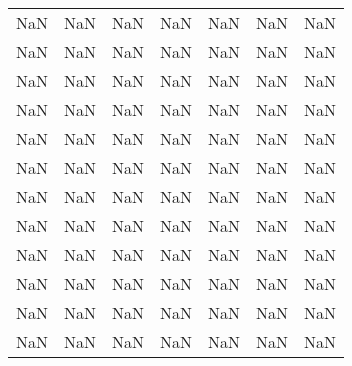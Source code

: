 \begin{tabular}{rrrrrrr}
     NaN &         NaN &         NaN &     NaN &   NaN &          NaN &      NaN \\
     NaN &         NaN &         NaN &     NaN &   NaN &          NaN &      NaN \\
     NaN &         NaN &         NaN &     NaN &   NaN &          NaN &      NaN \\
     NaN &         NaN &         NaN &     NaN &   NaN &          NaN &      NaN \\
     NaN &         NaN &         NaN &     NaN &   NaN &          NaN &      NaN \\
     NaN &         NaN &         NaN &     NaN &   NaN &          NaN &      NaN \\
     NaN &         NaN &         NaN &     NaN &   NaN &          NaN &      NaN \\
     NaN &         NaN &         NaN &     NaN &   NaN &          NaN &      NaN \\
     NaN &         NaN &         NaN &     NaN &   NaN &          NaN &      NaN \\
     NaN &         NaN &         NaN &     NaN &   NaN &          NaN &      NaN \\
     NaN &         NaN &         NaN &     NaN &   NaN &          NaN &      NaN \\
     NaN &         NaN &         NaN &     NaN &   NaN &          NaN &      NaN \\
\bottomrule
\end{tabular}
